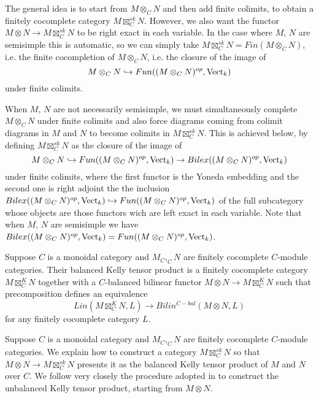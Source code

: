 \begin{remark}The general idea is to start from $M\otimes_C N$ and then add finite colimits, to
obtain a finitely cocomplete category $M\boxtimes_C^{sk} N$. 
However, we also want the functor $M\otimes N \to M\boxtimes^{sk}_C N$ to be right exact
in each variable. In the case where $M$, $N$ are semisimple this is automatic, so
we can simply take $M\boxtimes_C^{sk} N=Fin(M\otimes_C N)$, i.e. the finite cocompletion
of $M\otimes_C N$, i.e. the closure of the image of $$M\otimes_C N\hookrightarrow Fun((M\otimes_C N)^{op},\operatorname{Vect}_k)$$
under finite colimits. 

When $M$, $N$ are not 
necessarily semisimple, we must simultaneously complete $M\otimes_C N$ under finite
colimits and also force diagrams coming from colimit diagrams in $M$ and $N$ to become
colimits in $M\boxtimes_C^{sk} N$. This is achieved below, by defining $M\boxtimes_C^{sk} N$ as the closure of the
image of $$M\otimes_C N\hookrightarrow Fun((M\otimes_C N)^{op},\operatorname{Vect}_k)\to Bilex((M\otimes_C N)^{op},\operatorname{Vect}_k)$$ 
under finite colimits, where the first functor is the Yoneda embedding and 
the second one is right adjoint the the inclusion 
$Bilex((M\otimes_C N)^{op},\operatorname{Vect}_k)\hookrightarrow Fun((M\otimes_C N)^{op},\operatorname{Vect}_k)$ 
of the full subcategory  whose objects are those functors wich are left exact in each variable. 
Note that when $M$, $N$ are semisimple we have $Bilex((M\otimes_C N)^{op},\operatorname{Vect}_k)=Fun((M\otimes_C N)^{op},\operatorname{Vect}_k)$.\end{remark}

\begin{definition}
  \noindent Suppose $C$ is a monoidal category and $M_C, _{C}N$ are finitely
  cocomplete $C$-module categories. Their balanced Kelly tensor product is a
  finitely cocomplete category $M\boxtimes^K_C N$ together with a $C$-balanced
  bilinear functor $M\otimes N\to M\boxtimes^K_C N$ such that precomposition
  defines an equivalence $$Lin(M\boxtimes^K_C N,L)\to Bilin^{C-bal}(M\otimes
  N, L)$$ for any finitely cocomplete category $L$.
\end{definition}

Suppose $C$ is a monoidal category and $M_C, _{C}N$ are finitely cocomplete
$C$-module categories. We explain how to construct a category
$M\boxtimes_C^{sk}N$ so that $M\otimes N\to M\boxtimes_C^{sk}N$ presents it as
the balanced Kelly tensor product of $M$ and $N$ over $C$. We follow very
closely the procedure adopted in \cite{lopezfranco/tensor-products} to
construct the unbalanced Kelly tensor product, starting from $M\otimes N$.

